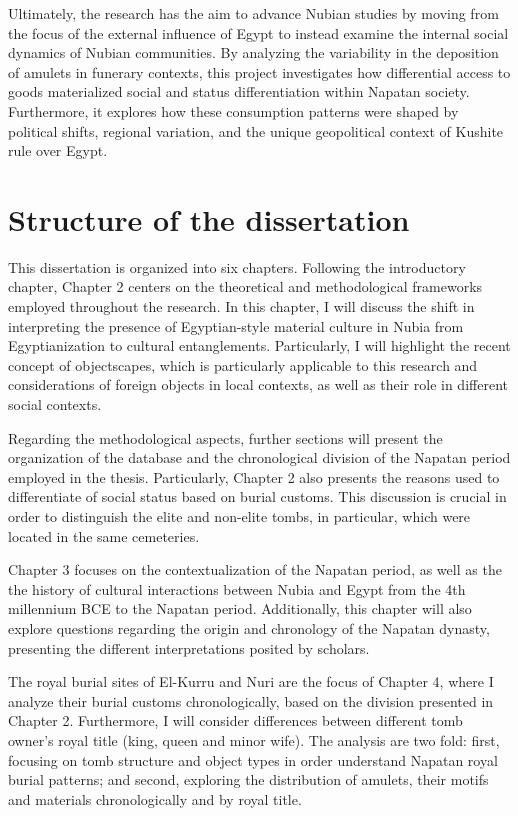 Ultimately, the research has the aim to advance Nubian studies by moving from the focus of the external influence of Egypt to instead examine the internal social dynamics of Nubian communities. By analyzing the variability in the deposition of amulets in funerary contexts, this project investigates how differential access to goods materialized social and status differentiation within Napatan society. Furthermore, it explores how these consumption patterns were shaped by political shifts, regional variation, and the unique geopolitical context of Kushite rule over Egypt.


\section{Structure of the dissertation}


This dissertation is organized into six chapters. Following the introductory chapter, Chapter 2 centers on the theoretical and methodological frameworks employed throughout the research. In this chapter, I will discuss the shift in interpreting the presence of Egyptian-style material culture in Nubia from Egyptianization to cultural entanglements. Particularly, I will highlight the recent concept of objectscapes, which is particularly applicable to this research and considerations of foreign objects in local contexts, as well as their role in different social contexts.


Regarding the methodological aspects, further sections will present the organization of the database and the chronological division of the Napatan period employed in the thesis. Particularly, Chapter 2 also presents the reasons used to differentiate of social status based on burial customs. This discussion is crucial in order to distinguish the elite and non-elite tombs, in particular, which were located in the same cemeteries.


Chapter 3 focuses on the contextualization of the Napatan period, as well as the the history of cultural interactions between Nubia and Egypt from the 4th millennium BCE to the Napatan period. Additionally, this chapter will also explore questions regarding the origin and chronology of the Napatan dynasty, presenting the different interpretations posited by scholars.


The royal burial sites of El-Kurru and Nuri are the focus of Chapter 4, where  I analyze their burial customs chronologically, based on the division presented in Chapter 2. Furthermore, I will consider differences between different tomb owner’s royal title (king, queen and minor wife). The analysis are two fold: first, focusing on tomb structure and object types in order understand Napatan royal burial patterns; and second, exploring the distribution of amulets, their motifs and materials chronologically and by royal title.


